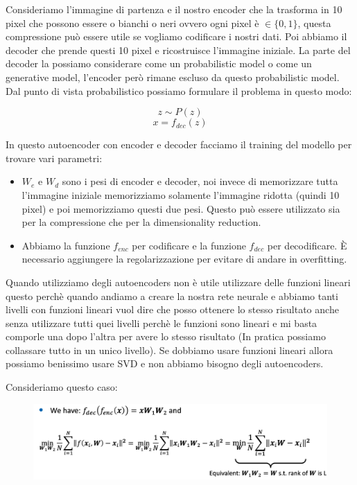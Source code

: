 \documentclass[14pt]{extreport}
\begin{document}
Consideriamo l'immagine di partenza e il nostro encoder che la trasforma in 10 pixel che possono essere o bianchi o neri ovvero ogni pixel è $\in
\{0,1\}$, questa compressione può essere utile se vogliamo codificare i nostri dati. Poi abbiamo il decoder che prende questi 10 pixel e ricostruisce
l'immagine iniziale. La parte del decoder la possiamo considerare come un probabilistic model o come un generative model, l'encoder però rimane
escluso da questo probabilistic model. Dal punto di vista probabilistico possiamo formulare il problema in questo modo:

$$z \sim P(z)$$
$$x = f_{dec}(z)$$

In questo autoencoder con encoder e decoder facciamo il training del modello per trovare vari parametri:
\begin{itemize}
	\item $W_e$ e $W_d$ sono i pesi di encoder e decoder, noi invece di memorizzare tutta l'immagine iniziale memorizziamo solamente l'immagine
	      ridotta (quindi 10 pixel) e poi memorizziamo questi due pesi. Questo può essere utilizzato sia per la compressione che per la dimensionality
	      reduction.
	\item Abbiamo la funzione $f_{enc}$ per codificare e la funzione $f_{dec}$ per decodificare. È necessario aggiungere la regolarizzazione per
	evitare di andare in overfitting.
\end{itemize}

Quando utilizziamo degli autoencoders non è utile utilizzare delle funzioni lineari questo perchè quando andiamo a creare la nostra rete neurale e
abbiamo tanti livelli con funzioni lineari vuol dire che posso ottenere lo stesso risultato anche senza utilizzare tutti quei livelli perchè le
funzioni sono lineari e mi basta comporle una dopo l'altra per avere lo stesso risultato (In pratica possiamo collassare tutto in un unico livello).
Se dobbiamo usare funzioni lineari allora possiamo benissimo usare SVD e non abbiamo bisogno degli autoencoders.

Consideriamo questo caso:


\begin{figure}[H]
	\centering
	\includegraphics[width=0.7\linewidth]{536.jpeg}
\end{figure}
\end{document}
